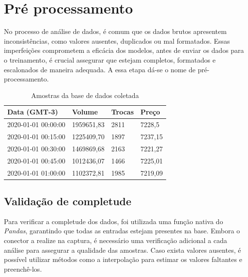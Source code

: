 \section{Pré processamento} \label{sec:preprocessamento}
No processo de análise de dados, é comum que os dados brutos apresentem inconsistências, como valores ausentes, duplicados ou mal formatados. 
Essas imperfeições comprometem a eficácia dos modelos, antes de enviar os dados para o treinamento, é crucial assegurar que estejam completos, formatados e escalonados de maneira adequada.
A essa etapa dá-se o nome de pré-processamento.

\begin{table}[!htb]
    \caption{Amostras da base de dados coletada} \label{tab:amostras}
    \begin{tabularx}{\textwidth}{X|X|X|X}
    \hline
    Data (GMT-3) & Volume & Trocas & Preço \\ \hline
    2020-01-01 00:00:00   & 1959651,83      & 2811            & 7228,5         \\ \hline
    2020-01-01 00:15:00   & 1225409,70      & 1897            & 7237,15        \\ \hline
    2020-01-01 00:30:00   & 1469869,68      & 2163            & 7221,27        \\ \hline
    2020-01-01 00:45:00   & 1012436,07      & 1466            & 7225,01        \\ \hline
    2020-01-01 01:00:00   & 1102372,81      & 1985            & 7219,09        \\ \hline
    \end{tabularx}
\end{table}

\subsection{Validação de completude} \label{sec:completude}
Para verificar a completude dos dados, foi utilizada uma função nativa do \textit{Pandas}, garantindo que todas as entradas estejam presentes na base.
Embora o conector a realize na captura, é necessário uma verificação adicional a cada análise para assegurar a qualidade das amostras. 
Caso exista valores ausentes, é possível utilizar métodos como a interpolação para estimar os valores faltantes e preenchê-los.


